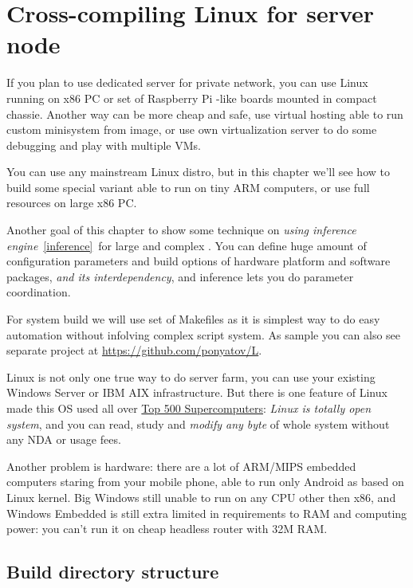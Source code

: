 \chapter{Cross-compiling Linux for server node}\label{cross}\clearpage

\noindent
If you plan to use dedicated server for private
network, you can use Linux running on x86 PC or set of Raspberry Pi -like boards
mounted in compact chassie. Another way can be more cheap and safe, use virtual
hosting able to run custom minisystem from image, or use own virtualization
server to do some debugging and play with multiple VMs.

You can use any mainstream Linux distro, but
in this chapter we'll see how to build some special 
variant able to run on tiny ARM computers, or use full resources on large x86
PC.

Another goal of this chapter to show some technique on \emph{using inference
engine}\ \ref{inference}\ for large and complex . You can define huge amount of configuration parameters and build
options of hardware platform and software packages, \emph{and its
interdependency}, and inference lets you do parameter coordination.

For system build we will use set of Makefiles as it is simplest way to do easy
automation without infolving complex script system. As sample you can also see
separate project at \url{https://github.com/ponyatov/L}.

Linux is not only one true way to do server farm, you can use your existing
Windows Server or IBM AIX infrastructure. But there is one feature of Linux made
this OS used all over
\href{https://www.top500.org/statistics/details/osfam/1}{Top 500
Supercomputers}: \emph{Linux is totally open system}, and you can read, study
and \emph{modify any byte} of whole system without any NDA or usage fees.

Another problem is hardware: there are a lot of ARM/MIPS embedded computers
staring from your mobile phone, able to run only Android as based on Linux
kernel. Big Windows still unable to run on any CPU other then x86, and Windows Embedded is still extra limited in requirements to RAM
and computing power: you can't run it on cheap headless router with 32M RAM.

\clearpage
\section{Build directory structure}


